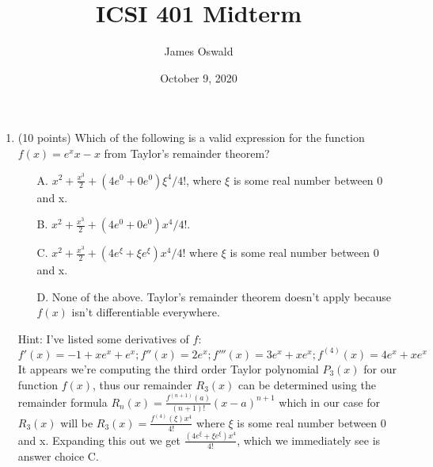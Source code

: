 \documentclass{article}
\author{James Oswald}
\date{October 9, 2020}
\title{ICSI 401 Midterm}
\begin{document}
\maketitle
\thispagestyle{fancy}

\begin{enumerate}
    \item (10 points) Which of the following is a valid expression for the function $f(x)=e^{x}x - x$ from Taylor’s remainder theorem?
    \begin{enumerate}
        \item[A.] $x^2 + \frac{x^3}{2} + (4e^0 + 0e^0)\xi^4/4!$, where $\xi$ is some real number between 0 and x.
        \item[B.] $x^2 + \frac{x^3}{2} + (4e^0 + 0e^0)x^4/4!$.
        \item[C.] $x^2 + \frac{x^3}{2} + (4e^\xi + \xi e^\xi)x^4/4!$ where $\xi$ is some real number between 0 and x.
        \item[D.] None of the above. Taylor’s remainder theorem doesn't apply because $f(x)$ isn't differentiable everywhere.
    \end{enumerate}
    Hint: I've listed some derivatives of $f$: $f'(x) = -1 + xe^x + e^x; f''(x) = 2e^x; f'''(x) = 3e^x + xe^x; f^{(4)}(x)=4e^x+xe^x$
    \newline
    \newline
    It appears we're computing the third order Taylor polynomial $P_3(x)$ for our function $f(x)$, thus our remainder $R_3(x)$ can be determined using the remainder formula $R_n(x)=\frac{f^{(n+1)}(a)}{(n+1)!}(x-a)^{n+1}$ which in our case for $R_3(x)$ will be $R_3(x)=\frac{f^{(4)}(\xi)x^4}{4!}$ where $\xi$ is some real number between 0 and x. Expanding this out we get $\frac{(4e^\xi + \xi e^\xi)x^4}{4!}$, which we immediately see is answer choice C. 
    

\end{enumerate}
\end{document}

